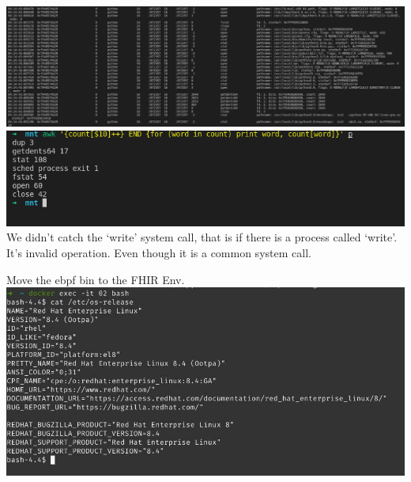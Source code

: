 \documentclass{beamer}
\begin{document}
\begin{CJK*}{UTF8}{bsmi}
  \begin{frame}
    \includegraphics[width=\textwidth]{Screenshot_2021-08-13_12-30-53.png}
    \includegraphics[width=\textwidth]{Screenshot_2021-08-13_12-29-19.png}
    We didn't catch the `write' system call, that is if there is a process called `write'.\\
    It's invalid operation.
    Even though it is a common system call.
  \end{frame}

  \begin{frame}{Move the ebpf bin to the FHIR Env.}
    \includegraphics[width=\textwidth]{photo_2021-08-13_07-03-33.jpg}
  \end{frame}


\end{CJK*}
\end{document}
